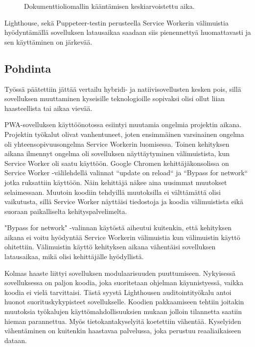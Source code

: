 \documentclass{tktltiki}
\begin{document}
\begin{figure}[h]
\begin{center}
\caption{Dokumenttioliomallin kääntämisen keskiarvoistettu aika.}
\label{Dom Interactive keskiarvoistettu aika}
\end{center}
\end{figure}

Lighthouse, sekä Puppeteer-testin perusteella Service Workerin välimuistia hyödyntämällä sovelluksen latausaikaa saadaan siis pienennettyä huomattavasti ja sen käyttäminen on järkevää. 

\clearpage
\subsection{Pohdinta}

Työssä päätettiin jättää vertailu hybridi- ja natiivisovellusten kesken pois, sillä sovelluksen muuttaminen kyseisille teknologioille sopivaksi olisi ollut liian haasteellista tai aikaa vievää.

PWA-sovelluksen käyttöönotossa esiintyi muutamia ongelmia projektin aikana. Projektin työkalut olivat vanhentuneet, joten ensimmäinen varsinainen ongelma oli yhteensopivuusongelma Service Workerin luomisessa. Toinen kehityksen aikana ilmennyt ongelma oli sovelluksen näyttäytyminen välimuistista, kun Service Worker oli saatu käyttöön. Google Chromen kehittäjäkonsolissa on Service Worker -välilehdellä valinnat “update on reload“ ja “Bypass for network“ jotka ruksattiin käyttöön. Näin kehittäjä näkee aina uusimmat muutokset selaimessaan. Muutoin koodiin tehdyillä muutoksilla ei välttämättä olisi vaikutusta, sillä Service Worker näyttäisi tiedostoja ja koodia välimuistista eikä suoraan paikalliselta kehityspalvelimelta. 

"Bypass for network" -valinnan käytöstä aiheutui kuitenkin, että kehityksen aikana ei voitu hyödyntää Service Workerin välimuistia kun välimuistin käyttö ohitettiin. Välimuistin käyttö kehityksen aikana vähentäisi sovelluksen latausaikaa, mikä olisi kehittäjälle hyödyllistä.

Kolmas haaste liittyi sovelluksen modulaarisuuden puuttumiseen. Nykyisessä sovelluksessa on paljon koodia, joka suoritetaan ohjelman käynnistyessä, vaikka koodia ei vielä tarvittaisi. Tästä syystä Lighthousen auditointityökalu antoi huonot suorituskykypisteet sovellukselle. Koodien pakkaamiseen tehtiin joitakin muutoksia työkalujen käyttömahdollisuuksien mukaan jolloin tilannetta saatiin hieman parannettua. Myös tietokantakyselyitä koetettiin vähentää. Kyselyiden vähentäminen on kuitenkin haastavaa palvelussa, joka perustuu reaaliaikaiseen dataan. 
\end{document}
